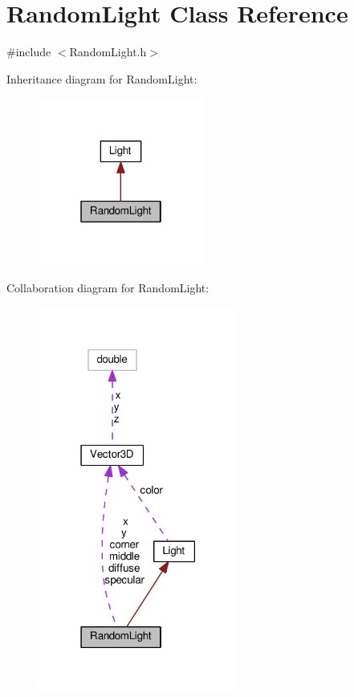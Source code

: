 \hypertarget{classRandomLight}{}\section{Random\+Light Class Reference}
\label{classRandomLight}


{\ttfamily \#include $<$Random\+Light.\+h$>$}



Inheritance diagram for Random\+Light\+:\nopagebreak
\begin{figure}[H]
\begin{center}
\leavevmode
\includegraphics[width=154pt]{classRandomLight__inherit__graph}
\end{center}
\end{figure}


Collaboration diagram for Random\+Light\+:\nopagebreak
\begin{figure}[H]
\begin{center}
\leavevmode
\includegraphics[width=186pt]{classRandomLight__coll__graph}
\end{center}
\end{figure}
